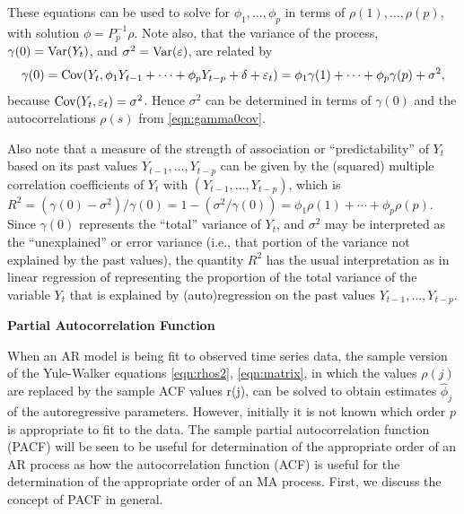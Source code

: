 These equations can be used to solve for $\phi_1, \ldots, \phi_p$ in terms of $\rho(1), \ldots, \rho(p)$, with solution $\phi = P_p^{-1} \rho$. Note also, that the variance of the process, $\gamma(0) = \operatorname{Var}(Y_t)$, and $\sigma^2= \operatorname{Var}(\varepsilon)$, are related by
	\begin{equation} \label{eqn:gamma0cov}
	\gamma(0)= \cov(Y_t, \phi_1 Y_{t-1} + \cdots + \phi_p Y_{t-p} + \delta + \varepsilon_t)= \phi_1 \gamma(1) + \cdots + \phi_p \gamma(p) + \sigma^2,
	\end{equation}
because $\operatorname{Cov}(Y_t, \varepsilon_t)= \sigma^2$. Hence $\sigma^2$ can be determined in terms of $\gamma(0)$ and the autocorrelations $\rho(s)$ from \eqref{eqn:gamma0cov}.


Also note that a measure of the strength of association or ``predictability'' of $Y_t$ based on its past values $Y_{t-1}, \ldots, Y_{t-p}$ can be given by the (squared) multiple correlation coefficients of $Y_t$ with $(Y_{t-1}, \ldots, Y_{t-p})$, which is $R^2= (\gamma(0) - \sigma^2)/\gamma(0) = 1 - ( \sigma^2 / \gamma(0) ) = \phi_1 \rho(1) + \cdots + \phi_p \rho(p)$. Since $\gamma(0)$ represents the ``total'' variance of $Y_t$, and $\sigma^2$ may be interpreted as the ``unexplained'' or error variance (i.e., that portion of the variance not explained by the past values), the quantity $R^2$ has the usual interpretation as in linear regression of representing the proportion of the total variance of the variable $Y_t$ that is explained by (auto)regression on the past values $Y_{t-1}, \ldots, Y_{t-p}$. \twomedskip


\noindent\textbf{Partial Autocorrelation Function} \twomedskip


When an AR model is being fit to observed time series data, the sample version of the Yule-Walker equations \eqref{eqn:rhos2}, \eqref{eqn:matrix}, in which the values $\rho(j)$ are replaced by the sample ACF values r(j), can be solved to obtain estimates $\hat{\phi}_j$ of the autoregressive parameters. However, initially it is not known which order $p$ is appropriate to fit to the data. The sample partial autocorrelation function (PACF) will be seen to be useful for determination of the appropriate order of an AR process as how the autocorrelation function (ACF) is useful for the determination of the appropriate order of an MA process. First, we discuss the concept of PACF in general.


